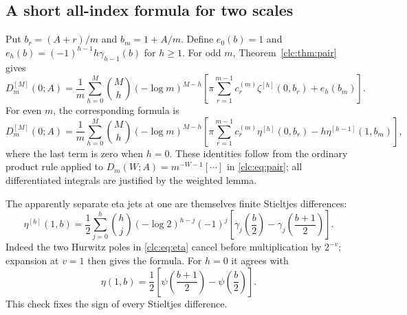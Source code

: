 \subsection{A short all-index formula for two scales}
Put $b_r=(A+r)/m$ and $b_m=1+A/m$. Define
$e_0(b)=1$ and $e_h(b)=(-1)^{h-1}h\gamma_{h-1}(b)$ for $h\ge1$.
For odd $m$, Theorem~\ref{clc:thm:pair} gives
\begin{equation}\label{clc:eq:odd-pair-jet}
 \boxed{\displaystyle
 D_m^{[M]}(0;A)=\frac1m\sum_{h=0}^M\binom Mh(-\log m)^{M-h}
 \left[\pi\sum_{r=1}^{m-1}c_r^{(m)}\zeta^{[h]}(0,b_r)
                       +e_h(b_m)\right].}
\end{equation}
For even $m$, the corresponding formula is
\begin{equation}\label{clc:eq:even-pair-jet}
 \boxed{\displaystyle
 D_m^{[M]}(0;A)=\frac1m\sum_{h=0}^M\binom Mh(-\log m)^{M-h}
 \left[\pi\sum_{r=1}^{m-1}c_r^{(m)}\eta^{[h]}(0,b_r)
               -h\eta^{[h-1]}(1,b_m)\right],}
\end{equation}
where the last term is zero when $h=0$. These identities follow from
the ordinary product rule applied to
$D_m(W;A)=m^{-W-1}[\cdots]$ in \eqref{clc:eq:pair}; all differentiated
integrals are justified by the weighted lemma.

The apparently separate eta jets at one are themselves finite
Stieltjes differences:
\begin{equation}\label{clc:eq:eta-Stieltjes}
 \eta^{[h]}(1,b)=\frac12\sum_{j=0}^h\binom hj(-\log2)^{h-j}(-1)^j
 \left[\gamma_j\left(\frac b2\right)
       -\gamma_j\left(\frac{b+1}2\right)\right].
\end{equation}
Indeed the two Hurwitz poles in \eqref{clc:eq:eta} cancel before
multiplication by $2^{-v}$; expansion at $v=1$ then gives the formula.
For $h=0$ it agrees with
\begin{equation}\label{clc:eq:eta-one}
 \eta(1,b)=\frac12\left[\psi\left(\frac{b+1}2\right)
                              -\psi\left(\frac b2\right)\right].
\end{equation}
This check fixes the sign of every Stieltjes difference.

